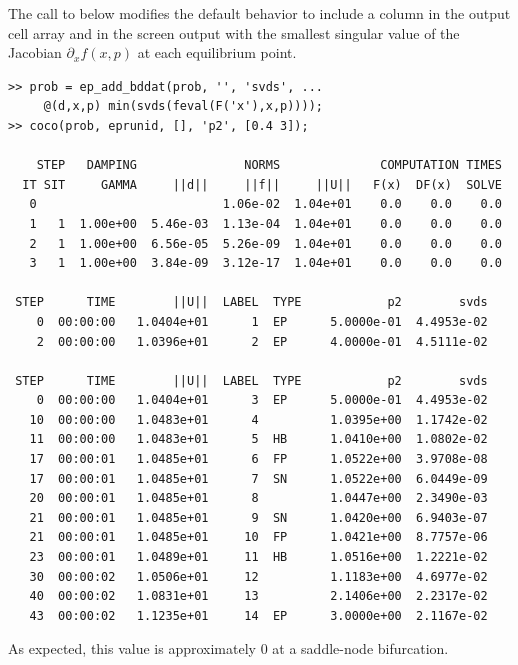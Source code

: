 The call to  below modifies the default behavior to include a column in the output cell array and in the screen output with the smallest singular value of the Jacobian $\partial_xf(x,p)$ at each equilibrium point.
\begin{lstlisting}[language=coco-highlight,frame=lines]
>> prob = ep_add_bddat(prob, '', 'svds', ...
     @(d,x,p) min(svds(feval(F('x'),x,p))));
>> coco(prob, eprunid, [], 'p2', [0.4 3]);

    STEP   DAMPING               NORMS              COMPUTATION TIMES
  IT SIT     GAMMA     ||d||     ||f||     ||U||   F(x)  DF(x)  SOLVE
   0                          1.06e-02  1.04e+01    0.0    0.0    0.0
   1   1  1.00e+00  5.46e-03  1.13e-04  1.04e+01    0.0    0.0    0.0
   2   1  1.00e+00  6.56e-05  5.26e-09  1.04e+01    0.0    0.0    0.0
   3   1  1.00e+00  3.84e-09  3.12e-17  1.04e+01    0.0    0.0    0.0

 STEP      TIME        ||U||  LABEL  TYPE            p2        svds
    0  00:00:00   1.0404e+01      1  EP      5.0000e-01  4.4953e-02
    2  00:00:00   1.0396e+01      2  EP      4.0000e-01  4.5111e-02

 STEP      TIME        ||U||  LABEL  TYPE            p2        svds
    0  00:00:00   1.0404e+01      3  EP      5.0000e-01  4.4953e-02
   10  00:00:00   1.0483e+01      4          1.0395e+00  1.1742e-02
   11  00:00:00   1.0483e+01      5  HB      1.0410e+00  1.0802e-02
   17  00:00:01   1.0485e+01      6  FP      1.0522e+00  3.9708e-08
   17  00:00:01   1.0485e+01      7  SN      1.0522e+00  6.0449e-09
   20  00:00:01   1.0485e+01      8          1.0447e+00  2.3490e-03
   21  00:00:01   1.0485e+01      9  SN      1.0420e+00  6.9403e-07
   21  00:00:01   1.0485e+01     10  FP      1.0421e+00  8.7757e-06
   23  00:00:01   1.0489e+01     11  HB      1.0516e+00  1.2221e-02
   30  00:00:02   1.0506e+01     12          1.1183e+00  4.6977e-02
   40  00:00:02   1.0831e+01     13          2.1406e+00  2.2317e-02
   43  00:00:02   1.1235e+01     14  EP      3.0000e+00  2.1167e-02
\end{lstlisting}
As expected, this value is approximately $0$ at a saddle-node bifurcation.

